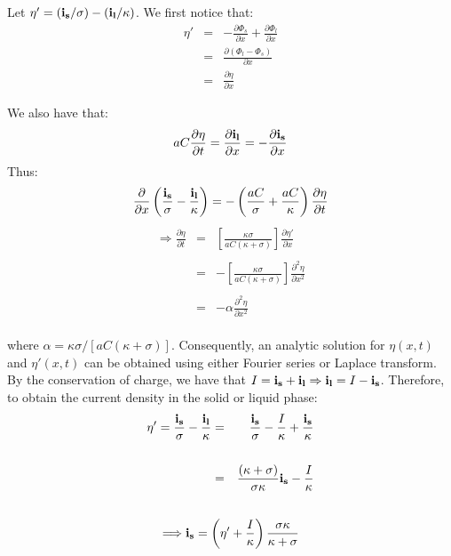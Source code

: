 Let $\eta' = (\bold{i_s} / \sigma) - (\bold{i_l} / \kappa)$. We first notice that:
\begin{eqnarray}
\eta' &=& - \frac{\partial \Phi_s}{\partial x} + \frac{\partial \Phi_l}{\partial x} \nonumber \\
&=& \frac{\partial (\Phi_l - \Phi_s)}{\partial x} \nonumber \\
&=& \frac{\partial \eta}{\partial x}
\end{eqnarray}

We also have that:
$$
aC \frac{\partial \eta}{\partial t} = \frac{\partial \bold{i_l}}{\partial x} = -\frac{\partial \bold{i_s}}{\partial x}
$$
Thus:
$$
\frac{\partial}{\partial x}\left(\frac{\bold{i_s}}{\sigma} - \frac{\bold{i_l}}{\kappa}\right) = -\left(\frac{aC}{\sigma} + \frac{aC}{\kappa}\right)\frac{\partial \eta}{\partial t}
$$
\begin{eqnarray}
\Longrightarrow \frac{\partial \eta}{\partial t} &=& \left[\frac{\kappa\sigma}{aC(\kappa+\sigma)}\right]\frac{\partial \eta'}{\partial x} \nonumber \\
\nonumber \\
&=& -\left[\frac{\kappa\sigma}{aC(\kappa+\sigma)}\right]\frac{\partial^2 \eta}{\partial x^2} \nonumber \\
\nonumber \\
&=& -\alpha \frac{\partial^2 \eta}{\partial x^2}
\end{eqnarray}
\\
where $\alpha = \kappa\sigma/[aC(\kappa+\sigma)]$.
Consequently, an analytic solution for $\eta(x,t)$ and $\eta'(x,t)$ can be obtained using either Fourier series or Laplace transform.
By the conservation of charge, we have that $I = \bold{i_s} + \bold{i_l} \Rightarrow \bold{i_l} = I - \bold{i_s}$.
Therefore, to obtain the current density in the solid or liquid phase:
\begin{eqnarray}
\eta' = \frac{\bold{i_s}}{\sigma} - \frac{\bold{i_l}}{\kappa} &=& \frac{\bold{i_s}}{\sigma} - \frac{I}{\kappa} + \frac{\bold{i_s}}{\kappa} \nonumber \\
\nonumber \\
&=& \frac{(\kappa + \sigma)}{\sigma\kappa} \bold{i_s} - \frac{I}{\kappa} \nonumber \\
\nonumber 
\end{eqnarray}
\begin{equation}
\Longrightarrow \bold{i_s} = \left(\eta' + \frac{I}{\kappa}\right)\frac{\sigma\kappa}{\kappa + \sigma}
\label{eq:current analytic}
\end{equation}

